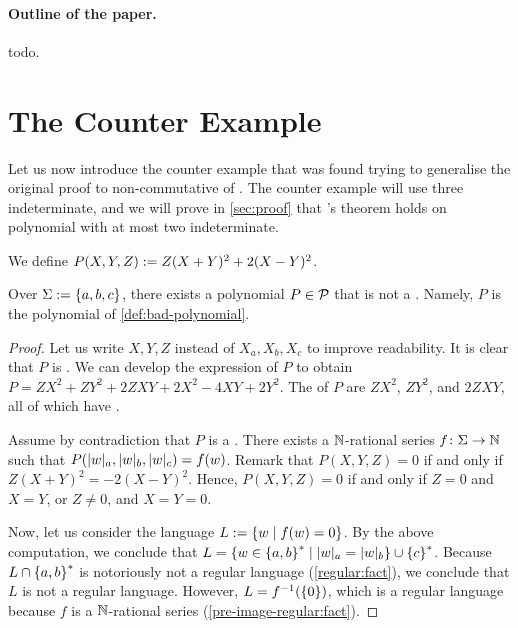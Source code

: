 \documentclass[a4paper,11pt]{article}
\begin{document}
\paragraph*{Outline of the paper.}
todo.

\section{The Counter Example}
\label{sec:c-example}

Let us now introduce the counter example that was found trying to generalise
the original proof to non-commutative  of
. The counter example will use three indeterminate, and
we will prove in \cref{sec:proof} that \citeauthor{KARH77}’s theorem holds on
polynomial with at most two indeterminate.

\begin{definition}
    \label{def:bad-polynomial}
    We define $P(X,Y,Z) \mathrel{:=} Z (X + Y)^2 + 2 (X - Y)^2$.
\end{definition}

\begin{theorem}
    \label{thm:counter-example}
    Over $\Sigma \mathrel{:=} \mathopen{\{} a,b,c \mathclose{\}}$,
    there exists a polynomial $P \in \mathcal{P}$ that is not
    a . Namely,
    $P$ is the polynomial of \cref{def:bad-polynomial}.
\end{theorem}
\begin{proof}
    Let us write $X,Y,Z$ instead of $X_a, X_b, X_c$ to improve
    readability.
    It is clear that $P$ is . We can develop
    the expression of $P$ to 
    obtain
    $P = ZX^2 + ZY^2 + 2ZXY + 2X^2 -4XY + 2Y^2$.
    The  of $P$
    are $ZX^2$, $ZY^2$, and $2ZXY$, all of which have
    .

    Assume by contradiction that $P$ is a .
    There exists a 
    $\mathbb{N}$-rational series $f \colon \Sigma \to \mathbb{N}$
    such that $P(\card[a]{w}, \card[b]{w}, \card[c]{w}) = f(w)$.
    Remark that $P(X,Y,Z) = 0$
    if and only if $Z(X+Y)^2 = -2 (X-Y)^2$. Hence,
    $P(X,Y,Z)=0$ if and only if $Z = 0$ and $X = Y$, or 
    $Z \neq 0$, and $X = Y = 0$.

    Now, let us consider the language $L \mathrel{:=} \mathopen{\{} w \mid  f(w) = 0 \mathclose{\}}$. By the
    above computation, we conclude that $L = \setof{ w \in \set{a,b}^* }{
    \card[a]{w} = \card[b]{w} } \cup \set{ c }^*$.
    Because $L \cap \mathopen{\{} a,b \mathclose{\}}^*$ is notoriously not a regular language
    (\cref{regular:fact}), we
    conclude that $L$ is not a regular language.
    However, $L = f^{-1}(\mathopen{\{} 0 \mathclose{\}})$, which is a regular language
    because $f$ is a $\mathbb{N}$-rational series
    (\cref{pre-image-regular:fact}).
\end{proof}
\end{document}
